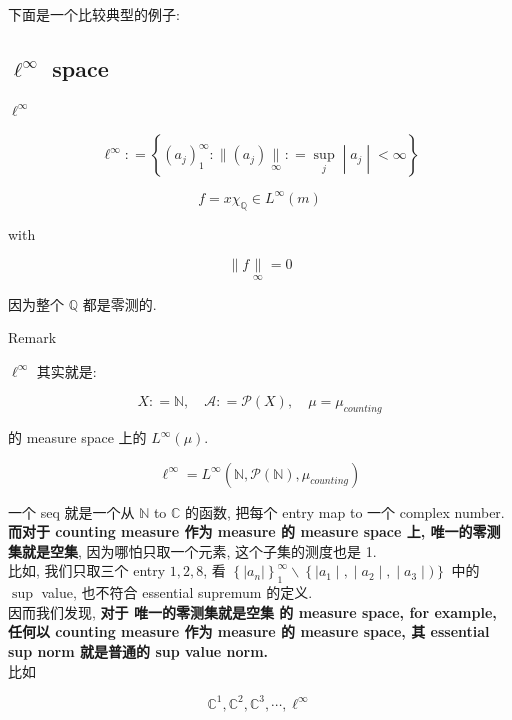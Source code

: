 \documentclass{qlnotes-export}
\begin{document}
下面是一个比较典型的例子:

\subsection{\texorpdfstring{\(\ell^{\infty}\) space}{\textbackslash ell\^{}\{\textbackslash infty\} space}}\label{ellinfty-space}

\begin{definition}{\protect{}\label{kn-ell-infty}{\textbf{\(\ell^{\infty}\)}}}

\[\ell^{\infty}: = \left\{ (a_{j})_{1}^{\infty}: \parallel (a_{j})\underset{\infty}{\parallel}: = \sup\limits_{j} \middle| a_{j} \middle| < \infty \right\}\]

\end{definition}

\begin{example}

\[f = x\chi_{\mathbb{Q}} \in L^{\infty}(m)\]

with

\[\parallel f\underset{\infty}{\parallel} = 0\]

因为整个 \(\mathbb{Q}\) 都是零测的.

\end{example}

\begin{qlremark}{Remark}

\(\ell^{\infty}\) 其实就是:

\[X: = {\mathbb{N}},\quad\mathcal{A}: = \mathcal{P}(X),\quad\mu = \mu_{counting}\]

的 measure space 上的 \(L^{\infty}(\mu)\).

\[\ell^{\infty} = L^{\infty}({\mathbb{N}},\mathcal{P}({\mathbb{N}}),\mu_{counting})\]

一个 seq 就是一个从 \(\mathbb{N}\) to \(\mathbb{C}\) 的函数, 把每个 entry map to 一个 complex number.\\
\textbf{而对于 counting measure 作为 measure 的 measure space 上, 唯一的零测集就是空集}, 因为哪怕只取一个元素, 这个子集的测度也是 1.\\
比如, 我们只取三个 entry \(1,2,8\), 看 \(\left\{ {|a_{n}|} \right\}_{1}^{\infty}\backslash\left\{ |a_{1} \middle| , \middle| a_{2} \middle| , \middle| a_{3} \middle| ) \right\}\) 中的 \(\sup\) value, 也不符合 essential supremum 的定义.\\
因而我们发现, \textbf{对于 唯一的零测集就是空集 的 measure space, for example, 任何以 counting measure 作为 measure 的 measure space, 其 essential sup norm 就是普通的 sup value norm.}\\
比如

\[{\mathbb{C}}^{1},{\mathbb{C}}^{2},{\mathbb{C}}^{3},\cdots,\ell^{\infty}\]

\end{qlremark}
\end{document}
